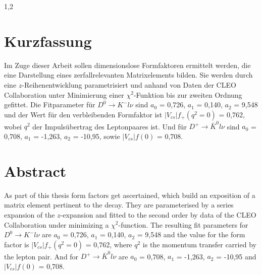 \documentclass[11pt,a4paper,twoside]{report}
\begin{document}
\begin{spacing}{1,2}
\newpage



\thispagestyle{empty}
\section*{Kurzfassung}
Im Zuge dieser Arbeit sollen dimensionslose Formfaktoren ermittelt werden, die eine Darstellung eines zerfallrelevanten Matrixelements bilden. Sie werden
durch eine $z$-Reihenentwicklung parametrisiert und anhand von Daten der CLEO Collaboration unter Minimierung einer $\chi^2$-Funktion bis zur 
zweiten Ordnung gefittet. Die Fitparameter für $D^0\rightarrow  K^- l \nu$ sind $a_0$ = 0,726, $a_1$ = 0,140, $a_2$ = 9,548 und der Wert für den verbleibenden Formfaktor ist $|V_{cs}|f_+(q^2=0)$ = 0,762, wobei 
$q^2$ der Impulsübertrag des Leptonpaares ist. Und für $D^+\rightarrow \bar K^0 l \nu$ sind $a_0$ = 0,708, $a_1$ = -1,263, $a_2$ = -10,95, sowie $|V_{cs}|f(0)$ = 0,708.


\section*{Abstract}
As part of this thesis form factors get ascertained, which build an exposition of a matrix element pertinent to the decay. They are parameterised by a
series expansion of the $z$-expansion and fitted to the second order by data of the CLEO Collaboration under minimizing a $\chi^2$-function. The resulting
fit parameters for $D^0\rightarrow  K^- l \nu$ are $a_0$ = 0,726, $a_1$ = 0,140, $a_2$ = 9,548 and the value for the form factor is $|V_{cs}|f_+(q^2=0)$ = 0,762, where $q^2$ is the momentum transfer carried by
the lepton pair. And for $D^+\rightarrow \bar K^0 l \nu$ are $a_0$ = 0,708, $a_1$ = -1,263, $a_2$ = -10,95 and $|V_{cs}|f(0)$ = 0,708.


\end{spacing}
\end{document}
